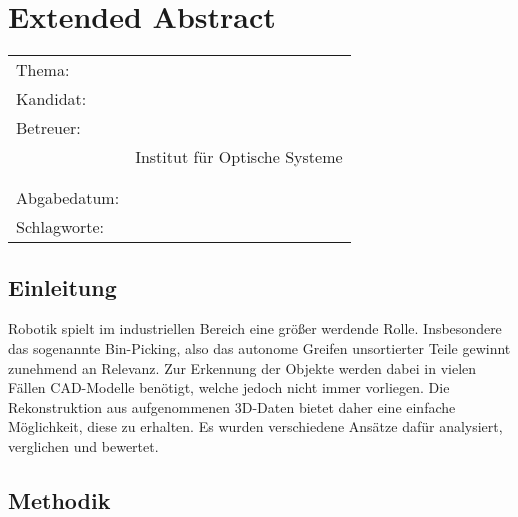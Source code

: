 \thispagestyle{plain}
\chapter*{Extended Abstract}
\label{ch:extended-abstract}

\begin{refsection}

\begin{center}
	\begin{tabular}{p{3cm}p{10cm}}
		Thema: & \thema \\[1ex]
		Kandidat: & \autor \\[1ex]
		Betreuer: & \prueferA \\
		 & Institut für Optische Systeme\\[1ex]
		 & \prueferB \\
		 & \firma \\[1ex]
		Abgabedatum: & \abgabedatum \\[1ex]
		Schlagworte: & \schlagworte \\[1ex]
	\end{tabular}
\end{center}


\section*{Einleitung}

Robotik spielt im industriellen Bereich eine größer werdende Rolle.
Insbesondere das sogenannte Bin-Picking, also das autonome Greifen unsortierter Teile gewinnt zunehmend an Relevanz.
Zur Erkennung der Objekte werden dabei in vielen Fällen CAD-Modelle benötigt, welche jedoch nicht immer vorliegen.
Die Rekonstruktion aus aufgenommenen 3D-Daten bietet daher eine einfache Möglichkeit, diese zu erhalten.
Es wurden verschiedene Ansätze dafür analysiert, verglichen und bewertet.


\section*{Methodik}





\printbibliography[heading=subbibliography]

\end{refsection}
\newpage
